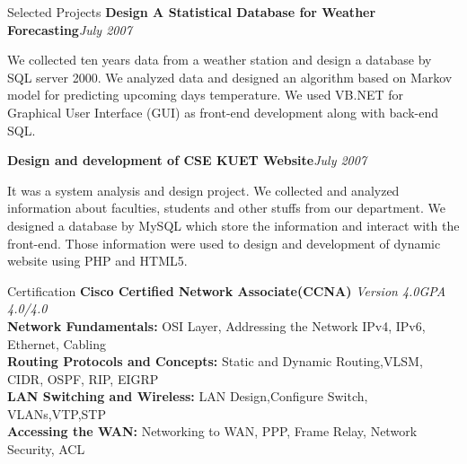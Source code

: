 \documentclass{resume} %
\begin{document}
\begin{rSection}{Selected Projects}
{\bf Design A Statistical Database for Weather Forecasting}\hfill{\em July 2007}

We collected ten years data from a weather station and design a database by SQL server 2000.
We analyzed data and designed an algorithm based on Markov model for predicting upcoming days temperature. 
We used VB.NET for Graphical User Interface (GUI) as front-end development along with back-end SQL.

{\bf Design and development of CSE KUET Website}\hfill{\em July 2007}

 It was a system analysis and design project.
 We collected and analyzed information about faculties, students and other stuffs from our department.
 We designed a database by MySQL which store the information and interact with the front-end.
 Those information were used to design and development of dynamic website using  PHP and HTML5.

\end{rSection}

\begin{rSection}{Certification}
{\bf Cisco Certified Network Associate(CCNA)} \hfill {\em Version 4.0}\hfill {\em GPA 4.0/4.0\\}
{\bf Network Fundamentals:} OSI Layer, Addressing the Network IPv4, IPv6, Ethernet, Cabling\\
{\bf Routing Protocols and Concepts:} Static and Dynamic Routing,VLSM, CIDR, OSPF, RIP, EIGRP\\
{\bf LAN Switching and Wireless:} LAN Design,Configure Switch, VLANs,VTP,STP\\
{\bf Accessing the WAN:} Networking to WAN, PPP, Frame Relay, Network Security, ACL
\end{rSection}

\end{document}
